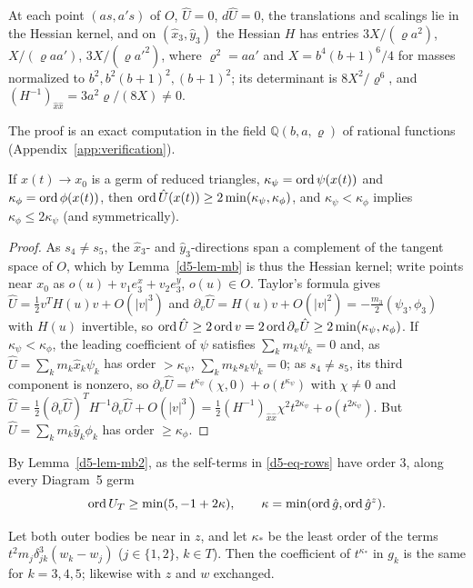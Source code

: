 \begin{lemma}\label{d5-lem-mb}
At each point $(as,a's)$ of $O$, $\hat U=0$, $d\hat U=0$, the translations and scalings lie in
the Hessian kernel, and on $(\hat x_3,\hat y_3)$ the Hessian $H$ has entries $3X/(\varrho a^2)$,
$X/(\varrho aa')$, $3X/(\varrho a'^2)$, where $\varrho^2=aa'$ and $X=b^4(b+1)^6/4$ for masses
normalized to $b^2,b^2(b+1)^2,(b+1)^2$; its determinant is $8X^2/\varrho^6$, and
$(H^{-1})_{\hat x\hat x}=3a^2\varrho/(8X)\ne0$.
\end{lemma}
The proof is an exact computation in the field $\mathbb Q(b,a,\varrho)$ of rational functions
(Appendix~\ref{app:verification}).

\begin{lemma}\label{d5-lem-mb2}
If $x(t)\to x_0$ is a germ of reduced triangles, $\kappa_\psi=\operatorname{ord}\psi(x(t))$ and
$\kappa_\phi=\operatorname{ord}\phi(x(t))$, then $\operatorname{ord}\hat U(x(t))\ge2\min(\kappa_\psi,\kappa_\phi)$, and
$\kappa_\psi<\kappa_\phi$ implies $\kappa_\phi\le2\kappa_\psi$ (and symmetrically).
\end{lemma}

\begin{proof}
As $s_4\ne s_5$, the $\hat x_3$- and $\hat y_3$-directions span a complement of the tangent space of
$O$, which by Lemma~\ref{d5-lem-mb} is thus the Hessian kernel; write points near $x_0$ as
$o(u)+v_1e^x_3+v_2e^y_3$, $o(u)\in O$.  Taylor's formula gives $\hat U=\frac12v^TH(u)v+O(|v|^3)$ and
$\partial_v\hat U=H(u)v+O(|v|^2)=-\frac{m_3}2(\psi_3,\phi_3)$ with $H(u)$ invertible, so
$\operatorname{ord}\hat U\ge2\operatorname{ord} v=2\operatorname{ord}\partial_v\hat U\ge2\min(\kappa_\psi,\kappa_\phi)$.  If
$\kappa_\psi<\kappa_\phi$, the leading coefficient of $\psi$ satisfies $\sum_km_k\psi_k=0$ and, as
$\hat U=\sum_km_k\hat x_k\psi_k$ has order $>\kappa_\psi$, $\sum_km_ks_k\psi_k=0$; as $s_4\ne s_5$,
its third component is nonzero, so $\partial_v\hat U=t^{\kappa_\psi}(\chi,0)+o(t^{\kappa_\psi})$ with
$\chi\ne0$ and $\hat U=\frac12(\partial_v\hat U)^TH^{-1}\partial_v\hat U+O(|v|^3)
=\frac12(H^{-1})_{\hat x\hat x}\chi^2t^{2\kappa_\psi}+o(t^{2\kappa_\psi})$.  But
$\hat U=\sum_km_k\hat y_k\phi_k$ has order $\ge\kappa_\phi$.
\end{proof}

By Lemma~\ref{d5-lem-mb2}, as the self-terms in \eqref{d5-eq-rows} have order $3$, along every
Diagram~5 germ
\begin{equation}\label{d5-eq-UT}
  \operatorname{ord} U_T\ge\min(5,-1+2\kappa),\qquad \kappa=\min(\operatorname{ord}\hat g,\operatorname{ord}\hat g^z).
\end{equation}
\begin{corollary}\label{d5-cor-uniform}
Let both outer bodies be near in $z$, and let $\kappa_*$ be the least order of the terms
$t^2m_j\delta_{jk}^3(w_k-w_j)$ ($j\in\{1,2\}$, $k\in T$).  Then the coefficient of $t^{\kappa_*}$ in
$g_k$ is the same for $k=3,4,5$; likewise with $z$ and $w$ exchanged.
\end{corollary}


